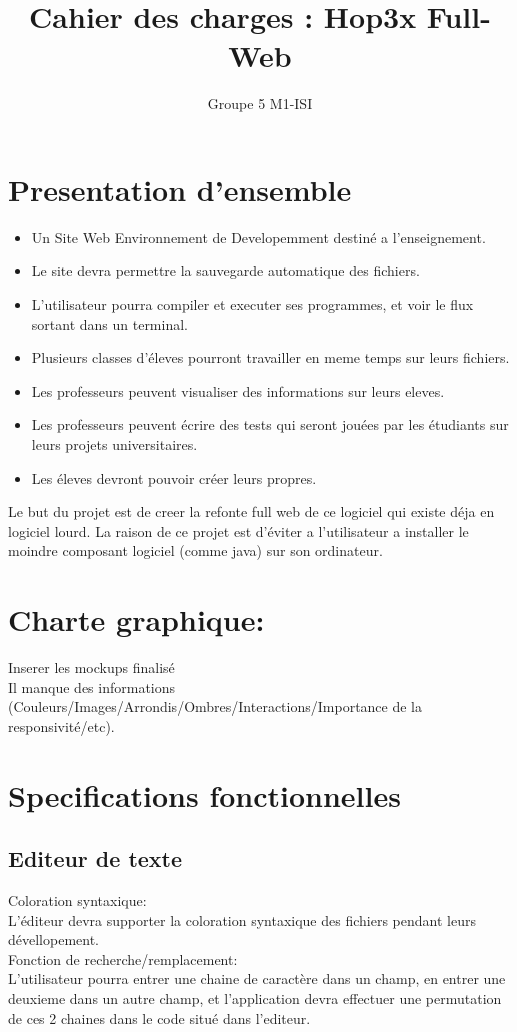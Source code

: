 \documentclass[12pt,a4paper,twoside]{article}
\begin{document}
\title{Cahier des charges : Hop3x Full-Web}
\author{Groupe 5 M1-ISI}
\maketitle


\section{Presentation d'ensemble}

\begin{itemize}
\item Un Site Web Environnement de Developemment destiné a l'enseignement.
\item Le site devra permettre la sauvegarde automatique des fichiers.
\item L'utilisateur pourra compiler et executer ses programmes, et voir le flux sortant dans un terminal.
\item Plusieurs classes d'éleves pourront travailler en meme temps sur leurs fichiers.
\item Les professeurs peuvent visualiser des informations sur leurs eleves.
\item Les professeurs peuvent écrire des tests qui seront jouées par les étudiants sur leurs projets universitaires.
\item Les éleves devront pouvoir créer leurs propres.
\end{itemize}

Le but du projet est de creer la refonte full web de ce logiciel qui existe déja en logiciel lourd.
La raison de ce projet est d'éviter a l'utilisateur a installer le moindre composant logiciel (comme java) sur son ordinateur.\\
\section{Charte graphique:}
Inserer les mockups finalisé\\
Il manque des informations (Couleurs/Images/Arrondis/Ombres/Interactions/Importance de la responsivité/etc).
\section{Specifications fonctionnelles}
\subsection{Editeur de texte}
Coloration syntaxique:\\
L'éditeur devra supporter la coloration syntaxique des fichiers pendant leurs dévellopement.\\
Fonction de recherche/remplacement:\\
L'utilisateur pourra entrer une chaine de caractère dans un champ, en entrer une deuxieme dans un autre champ, et l'application devra effectuer une permutation de ces 2 chaines dans le code situé dans l'editeur.\\
\end{document}

